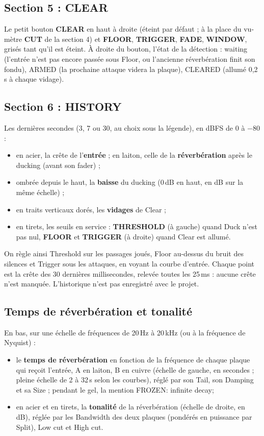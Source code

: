 \documentclass[a4paper,11pt]{article}
\newcommand{\ctl}[1]{\textsf{\textbf{#1}}}   %
\newcommand{\dB}{\,dB}
\begin{document}
\subsection{Section 5 : CLEAR}
Le petit bouton \ctl{CLEAR} en haut à droite (éteint par défaut ; à la place du vu-mètre
\ctl{CUT} de la section 4) et \ctl{FLOOR}, \ctl{TRIGGER}, \ctl{FADE}, \ctl{WINDOW}, grisés
tant qu'il est éteint. À droite du bouton, l'état de la détection : \og waiting\fg{} (l'entrée
n'est pas encore passée sous Floor, ou l'ancienne réverbération finit son fondu),
\og ARMED\fg{} (la prochaine attaque videra la plaque), \og CLEARED\fg{} (allumé 0,2\,s à
chaque vidage).

\subsection{Section 6 : HISTORY}
Les dernières secondes (3, 7 ou 30, au choix sous la légende), en dBFS de 0 à $-80$ :
\begin{itemize}
\item en acier, la crête de l'\textbf{entrée} ; en laiton, celle de la \textbf{réverbération}
  après le ducking (avant son fader) ;
\item ombrée depuis le haut, la \textbf{baisse} du ducking (0\dB{} en haut, en dB sur la même
  échelle) ;
\item en traits verticaux dorés, les \textbf{vidages} de Clear ;
\item en tirets, les seuils en service : \ctl{THRESHOLD} (à gauche) quand Duck n'est pas nul,
  \ctl{FLOOR} et \ctl{TRIGGER} (à droite) quand Clear est allumé.
\end{itemize}
On règle ainsi Threshold sur les passages joués, Floor au-dessus du bruit des silences et
Trigger sous les attaques, en voyant la courbe d'entrée. Chaque point est la crête des
30 dernières millisecondes, relevée toutes les 25\,ms : aucune crête n'est manquée.
L'historique n'est pas enregistré avec le projet.

\subsection{Temps de réverbération et tonalité}
En bas, sur une échelle de fréquences de 20\,Hz à 20\,kHz (ou à la fréquence de Nyquist) :
\begin{itemize}
\item le \textbf{temps de réverbération} en fonction de la fréquence de chaque plaque qui
  reçoit l'entrée, A en laiton, B en cuivre (échelle de gauche, en secondes ; pleine échelle de 2
  à 32\,s selon les courbes), réglé par son Tail, son Damping et sa Size ; pendant le gel, la
  mention \og FROZEN: infinite decay\fg ;
\item en acier et en tirets, la \textbf{tonalité} de la réverbération (échelle de droite, en
  dB), réglée par les Bandwidth des deux plaques (pondérés en puissance par Split), Low cut et
  High cut.
\end{itemize}
\end{document}
